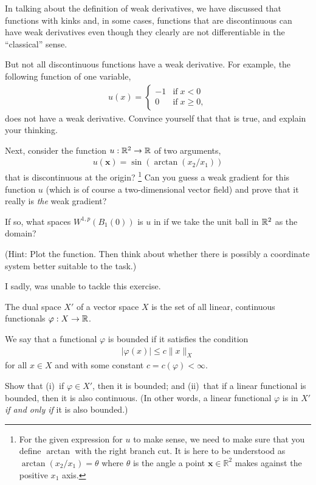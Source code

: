 \documentclass[12pt]{memoir}
\begin{document}
\begin{Ej}
  In talking about the definition of weak derivatives, we have
  discussed that functions with kinks and, in some cases, functions
  that are discontinuous can have weak derivatives even though they
  clearly are not differentiable in the ``classical'' sense.
  
But not all discontinuous functions have a weak derivative. For example,
the following function of one variable,
\begin{align*}
  u(x) = \begin{cases}
    -1 & \text{if}\; x<0
    \\
    0 & \text{if}\; x\ge 0,
  \end{cases}
\end{align*}
does not have a weak derivative. Convince yourself that that is true,
and explain your thinking.

Next, consider the function $u : \mathbb{R}^2 \rightarrow \mathbb{R}$ of two arguments,
\begin{align*}
  u(\mathbf x) = \sin(\arctan(x_2/x_1))
\end{align*}
that is discontinuous at the origin?%
\footnote{For the given expression for $u$ to make sense, we need to
  make sure that you define $\arctan$ with the right branch cut. It is
  here to be understood as $\arctan(x_2/x_1)=\theta$ where $\theta$ is
  the angle a point $\mathbf x\in{\mathbb R}^2$ makes against the
  positive $x_1$ axis.}
Can you guess a weak gradient for
this function $u$ (which is of course a two-dimensional vector field) and
prove that it really is \textit{the} weak gradient?

If so, what spaces $W^{1,p}(B_1(0))$ is $u$ in if we take
the unit ball in $\mathbb{R}^2$ as the domain?

(Hint: Plot the function. Then think about whether there is possibly a
coordinate system better suitable to the task.)
\end{Ej}

I sadly, was unable to tackle this exercise.

\begin{Ej}
    The dual space $X'$ of a vector space $X$ is the set of all linear,
continuous functionals $\varphi: X \rightarrow \mathbb{R}$.

We say that a functional $\varphi$ is
bounded if it satisfies the condition
\begin{align*}
  |\varphi(x)| \le c \|x\|_X
\end{align*}
for all $x\in X$ and with some constant $c=c(\varphi)<\infty$.

Show that (i)~if $\varphi\in X'$, then it is bounded; and
(ii)~that if a linear functional is bounded, then it is also
continuous. (In other words, a linear functional $\varphi$ is in $X'$
\textit{if and only if} it is also bounded.)
\end{Ej}
\end{document}
